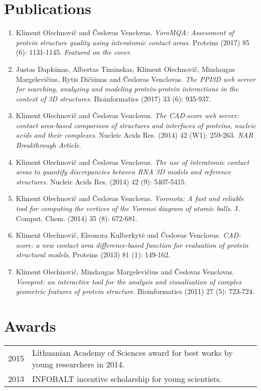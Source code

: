 \documentclass{article}
\begin{document}
\section*{Publications}
\begin{enumerate}
  \item Kliment Olechnovi\v{c} and \v{C}eslovas Venclovas.
        \emph{VoroMQA: Assessment of protein structure quality using interatomic contact areas}.
        Proteins (2017) 85 (6): 1131-1145. \emph{Featured on the cover}.
  \item Justas Dapk\={u}nas, Albertas Timinskas, Kliment Olechnovi\v{c}, Mindaugas Margelevi\v{c}ius, Rytis Di\v{c}i\={u}nas and \v{C}eslovas Venclovas.
        \emph{The PPI3D web server for searching, analyzing and modeling protein-protein interactions in the context of 3D structures}.
        Bioinformatics (2017) 33 (6): 935-937.
  \item Kliment Olechnovi\v{c} and \v{C}eslovas Venclovas.
        \emph{The CAD-score web server: contact area-based comparison of structures and interfaces of proteins, nucleic acids and their complexes}.
        Nucleic Acids Res. (2014) 42 (W1): 259-263. \emph{NAR Breakthrough Article}.
  \item Kliment Olechnovi\v{c} and \v{C}eslovas Venclovas.
        \emph{The use of interatomic contact areas to quantify discrepancies between RNA 3D models and reference structures}.
        Nucleic Acids Res. (2014) 42 (9): 5407-5415.
  \item Kliment Olechnovi\v{c} and \v{C}eslovas Venclovas.
        \emph{Voronota: A fast and reliable tool for computing the vertices of the Voronoi diagram of atomic balls}.
        J. Comput. Chem. (2014) 35 (8): 672-681.
  \item Kliment Olechnovi\v{c}, Eleonora Kulberkyt\.{e} and \v{C}eslovas Venclovas.
        \emph{CAD-score: a new contact area difference-based function for evaluation of protein structural models}.
        Proteins (2013) 81 (1): 149-162.
  \item Kliment Olechnovi\v{c}, Mindaugas Margelevi\v{c}ius and \v{C}eslovas Venclovas.
        \emph{Voroprot: an interactive tool for the analysis and visualization of complex geometric features of protein structure}.
        Bioinformatics (2011) 27 (5): 723-724.
\end{enumerate}


\section*{Awards}
\begin{tabular}{p{}p{}}
2015 & Lithuanian Academy of Sciences award for best works by young researchers in 2014. \\
2013 & INFOBALT incentive scholarship for young scientists.
\end{tabular}
\end{document}
